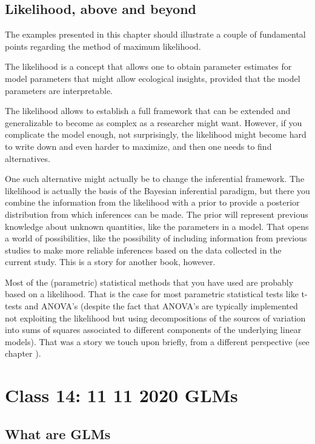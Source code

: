 \documentclass[
]{book}
\begin{document}
\hypertarget{likelihood-above-and-beyond}{%
\section{Likelihood, above and beyond}\label{likelihood-above-and-beyond}}

The examples presented in this chapter should illustrate a couple of fundamental points regarding the method of maximum likelihood.

The likelihood is a concept that allows one to obtain parameter estimates for model parameters that might allow ecological insights, provided that the model parameters are interpretable.

The likelihood allows to establish a full framework that can be extended and generalizable to become as complex as a researcher might want. However, if you complicate the model enough, not surprisingly, the likelihood might become hard to write down and even harder to maximize, and then one needs to find alternatives.

One such alternative might actually be to change the inferential framework. The likelihood is actually the basis of the Bayesian inferential paradigm, but there you combine the information from the likelihood with a prior to provide a posterior distribution from which inferences can be made. The prior will represent previous knowledge about unknown quantities, like the parameters in a model. That opens a world of possibilities, like the possibility of including information from previous studies to make more reliable inferences based on the data collected in the current study. This is a story for another book, however.

Most of the (parametric) statistical methods that you have used are probably based on a likelihood. That is the case for most parametric statistical tests like t-tests and ANOVA's (despite the fact that ANOVA's are typically implemented not exploiting the likelihood but using decompositions of the sources of variation into sums of squares associated to different components of the underlying linear models). That was a story we touch upon briefly, from a different perspective (see chapter ).

\hypertarget{aula14}{%
\chapter{Class 14: 11 11 2020 GLMs}\label{aula14}}

\hypertarget{what-are-glms}{%
\section{What are GLMs}\label{what-are-glms}}
\end{document}
